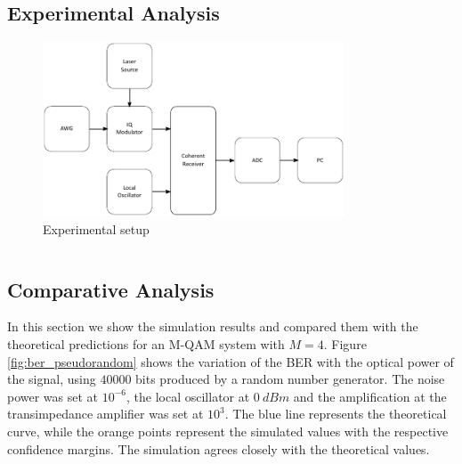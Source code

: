 \subsection*{Experimental Analysis}
\begin{figure}[H]
	\centering
	\includegraphics[width=0.8\textwidth]{./sdf/m_qam_system/figures/mqamExperimental20180206.pdf}
	\caption{Experimental setup}
	\label{fig:experimental_mqam_setup}
\end{figure}
%
%
\begin{table}[H]
	\centering
	\begin{tabulary}{1.0\textwidth}{|L|L|l|}
	\end{tabulary}
\end{table}


\subsection{Comparative Analysis}

In this section we show the simulation results and compared them with the theoretical predictions for an M-QAM system with $M=4$. Figure \ref{fig:ber_pseudorandom} shows the variation of the BER with the optical power of the signal, using $40000$ bits produced by a random number generator. The noise power was set at $10^{-6}$, the local oscillator at $0~dBm$ and the amplification at the transimpedance amplifier was set at $10^3$.
The blue line represents the theoretical curve, while the orange points represent the simulated values with the respective confidence margins. The simulation agrees closely with the theoretical values.



